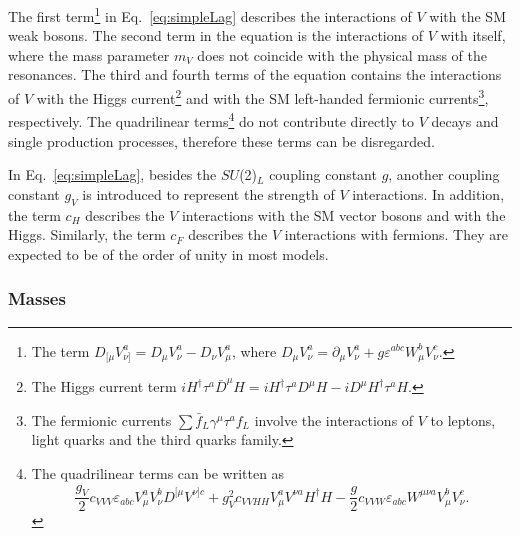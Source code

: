 The first term\footnote{The term \(D_{[\mu}V_{\nu]}^a = D_\mu V_\nu^a - D_\nu V_\mu^a\), where \(D_\mu V_\nu^a = \partial_\mu V_\nu^a + g\varepsilon^{abc}W_\mu^bV_\nu^c\).} in Eq.~\ref{eq:simpleLag} describes the interactions of $V$ with the SM weak bosons. The second term in the equation is the interactions of $V$ with itself, where the mass parameter $m_V$ does not coincide with the physical mass of the resonances. The third and fourth terms of the equation contains the interactions of $V$ with the Higgs current\footnote{The Higgs current term \(iH^\dagger\tau^a\bar{D}^\mu H = iH^\dagger\tau^aD^\mu H - iD^\mu H^\dagger\tau^aH\).} and with the SM left-handed fermionic currents\footnote{The fermionic currents \(\sum\bar{f}_L\gamma^\mu\tau^af_L\) involve the interactions of $V$ to leptons, light quarks and the third quarks family.}, respectively. The quadrilinear terms\footnote{The quadrilinear terms can be written as \[\frac{g_V}{2}c_{VVV}\varepsilon_{abc}V_\mu^aV_\nu^bD^{[\mu}V^{\nu]c} + g_V^2c_{VVHH}V_\mu^aV^{\nu a}H^\dagger H - \frac{g}{2}c_{VVW}\varepsilon_{abc}W^{\mu\nu a}V_\mu^bV_\nu^c.\]} do not contribute directly to $V$ decays and single production processes, therefore these terms can be disregarded.

In Eq.~\ref{eq:simpleLag}, besides the $SU$(2)$_L$ coupling constant $g$, another coupling constant $g_V$ is introduced to represent the strength of $V$ interactions. In addition, the term $c_H$ describes the $V$ interactions with the SM vector bosons and with the Higgs. Similarly, the term $c_F$ describes the $V$ interactions with fermions. They are expected to be of the order of unity in most models. 

\subsubsection*{Masses}


